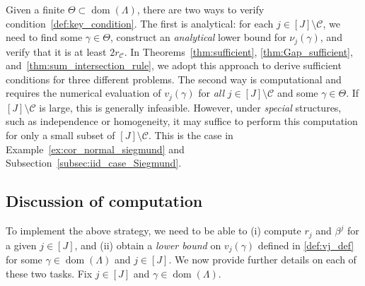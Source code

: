 \documentclass[aap,preprint]{imsart}
\theoremstyle{plain}
\theoremstyle{definition}
\begin{document}
Given a finite $\Theta \subset \operatorname{dom}(\Lambda)$, there are two ways to verify condition~\eqref{def:key_condition}. The first is analytical: for each $j \in [J] \setminus \mathcal{C}$, we need to find some $\gamma \in \Theta$, construct an \emph{analytical} lower bound for $\nu_j(\gamma)$, and verify that it is at least $2 r_\mathcal{C}$. In Theorems~\ref{thm:sufficient}, \ref{thm:Gap_sufficient}, and~\ref{thm:sum_intersection_rule}, we adopt this approach to derive sufficient conditions for three different problems. The second way is computational and requires the  numerical evaluation  of $v_j(\gamma)$ 
for \textit{all} 
$j \in [J] \setminus \mathcal{C}$ and some $\gamma \in \Theta$. If $[J] \setminus \mathcal{C}$ is large, this
is generally infeasible. However, under \textit{special} structures, such as independence or homogeneity, it may suffice to perform this computation for only a small subset of $[J] \setminus \mathcal{C}$. This is the case in Example~\ref{ex:cor_normal_siegmund} and Subsection~\ref{subsec:iid_case_Siegmund}.

 

  

  
  
   






  
 







\subsection{Discussion of computation} \label{subsec:computation}

To implement the above strategy, we need to be able to   (i) compute $r_j$ and $\beta^j$ for a given $j \in [J]$, and (ii)   obtain a \textit{lower bound} on $v_j(\gamma)$ defined in \eqref{def:vj_def} for some  $\gamma \in \operatorname{dom}(\Lambda)$ and $j \in [J]$.
We now provide further details on each of these two tasks. Fix $j \in [J]$ and $\gamma \in \operatorname{dom}(\Lambda)$.
\end{document}
